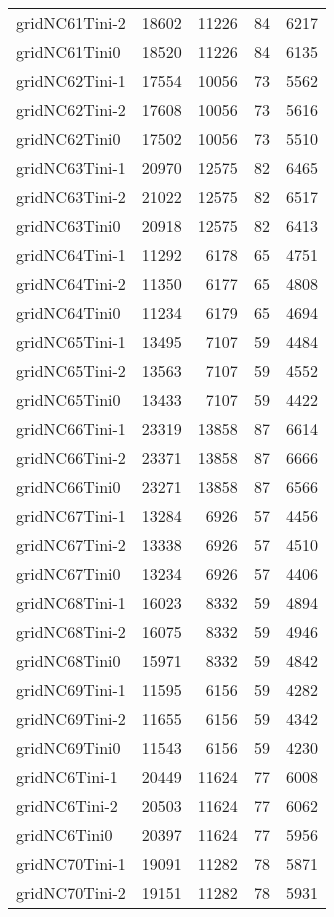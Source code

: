 \begin{longtable}{lrrrr}
gridNC61Tini-2 & 18602 & 11226 & 84 & 6217 \\
gridNC61Tini0 & 18520 & 11226 & 84 & 6135 \\
gridNC62Tini-1 & 17554 & 10056 & 73 & 5562 \\
gridNC62Tini-2 & 17608 & 10056 & 73 & 5616 \\
gridNC62Tini0 & 17502 & 10056 & 73 & 5510 \\
gridNC63Tini-1 & 20970 & 12575 & 82 & 6465 \\
gridNC63Tini-2 & 21022 & 12575 & 82 & 6517 \\
gridNC63Tini0 & 20918 & 12575 & 82 & 6413 \\
gridNC64Tini-1 & 11292 & 6178 & 65 & 4751 \\
gridNC64Tini-2 & 11350 & 6177 & 65 & 4808 \\
gridNC64Tini0 & 11234 & 6179 & 65 & 4694 \\
gridNC65Tini-1 & 13495 & 7107 & 59 & 4484 \\
gridNC65Tini-2 & 13563 & 7107 & 59 & 4552 \\
gridNC65Tini0 & 13433 & 7107 & 59 & 4422 \\
gridNC66Tini-1 & 23319 & 13858 & 87 & 6614 \\
gridNC66Tini-2 & 23371 & 13858 & 87 & 6666 \\
gridNC66Tini0 & 23271 & 13858 & 87 & 6566 \\
gridNC67Tini-1 & 13284 & 6926 & 57 & 4456 \\
gridNC67Tini-2 & 13338 & 6926 & 57 & 4510 \\
gridNC67Tini0 & 13234 & 6926 & 57 & 4406 \\
gridNC68Tini-1 & 16023 & 8332 & 59 & 4894 \\
gridNC68Tini-2 & 16075 & 8332 & 59 & 4946 \\
gridNC68Tini0 & 15971 & 8332 & 59 & 4842 \\
gridNC69Tini-1 & 11595 & 6156 & 59 & 4282 \\
gridNC69Tini-2 & 11655 & 6156 & 59 & 4342 \\
gridNC69Tini0 & 11543 & 6156 & 59 & 4230 \\
gridNC6Tini-1 & 20449 & 11624 & 77 & 6008 \\
gridNC6Tini-2 & 20503 & 11624 & 77 & 6062 \\
gridNC6Tini0 & 20397 & 11624 & 77 & 5956 \\
gridNC70Tini-1 & 19091 & 11282 & 78 & 5871 \\
gridNC70Tini-2 & 19151 & 11282 & 78 & 5931 \\

\end{longtable}
